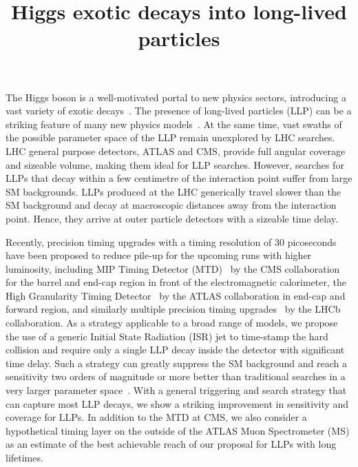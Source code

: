 \title{
Higgs exotic decays into long-lived particles
}



\label{Sec:9.1.2}

The Higgs boson is a well-motivated portal to new physics sectors, introducing a vast variety of exotic decays~\cite{Curtin:2013fra}.
The presence of long-lived particles (LLP) can be a striking feature of many new physics models~\cite{Liu:2018wte,Barbier:2004ez,Giudice:1998bp,Meade:2010ji,Arvanitaki:2012ps,ArkaniHamed:2012gw,Liu:2015bma,Chacko:2005pe, Burdman:2006tz,Kang:2008ea,Craig:2015pha, Davoli:2017swj}. 
At the same time, vast swaths of the possible parameter space of the LLP remain unexplored by LHC searches.
LHC general purpose detectors, ATLAS and CMS, provide full angular coverage and sizeable volume, making them ideal for LLP searches.
However, searches for LLPs that decay within a few centimetre of the interaction point suffer from large SM backgrounds. 
LLPs produced at the LHC generically travel slower than the SM background and decay at macroscopic distances away from the interaction point. Hence, they arrive at outer particle detectors with a sizeable time delay. 

Recently, precision timing upgrades with a timing resolution of 30 picoseconds have been proposed to reduce pile-up for the upcoming 
runs with higher luminosity, including MIP Timing Detector (MTD)~\cite{Collaboration:2296612}  by the CMS collaboration for 
the barrel and end-cap region in front of the electromagnetic calorimeter, the High Granularity Timing Detector~\cite{Allaire:2018bof} 
by the ATLAS collaboration in end-cap and forward region,  and similarly multiple precision timing upgrades~\cite{Bediaga:2018lhg} by the 
LHCb collaboration.
As a strategy applicable to a broad range of models, we propose the use of a generic Initial State Radiation (ISR) jet to time-stamp the hard collision and require only a single LLP decay inside the detector with significant time delay. Such a strategy can greatly suppress the SM background and 
reach a sensitivity two orders of magnitude or more better than traditional searches in a very larger parameter space~\cite{Aad:2015uaa, CMS:2014wda,Coccaro:2016lnz, Liu:2015bma}. 
With a general triggering and search strategy that can capture most LLP decays, 
we show a striking improvement in sensitivity and coverage for LLPs. In addition to the MTD at CMS, we also consider a hypothetical timing layer on the outside of the ATLAS Muon Spectrometer (MS) as an estimate of the best achievable reach of our proposal for LLPs with long lifetimes.  \\

